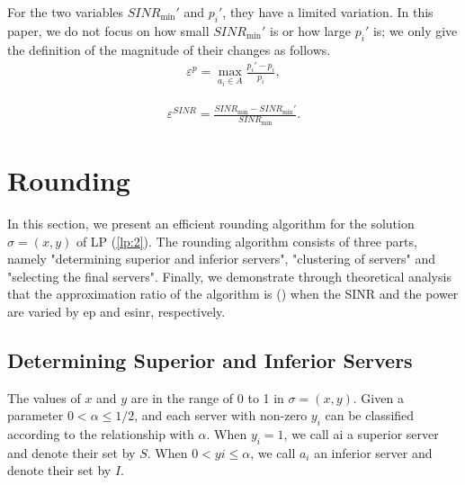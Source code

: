 \documentclass[11pt,a4paper]{article}
\begin{document}
For the two variables $SINR_{\min}'$ and $p_i'$, they have a limited variation. In this paper, we do not focus on how small $SINR_{\min}'$ is or how large $p_i'$ is; we only give the definition of the magnitude of their changes as follows.
\begin{eqnarray}
	{\varepsilon ^p} = \mathop {\max }\limits_{{a_i} \in A} \frac{{{p_i}' - {p_i}}}{{{p_i}}},
\end{eqnarray}


\begin{eqnarray}
	{\varepsilon ^{SINR}} = \frac{{SINR_{\min}} - SINR_{\min}'}{{SIN{R_{\min }}}}.
\end{eqnarray}



\section{Rounding}
In this section, we present an efficient rounding algorithm for the solution $\sigma=(x,y)$ of LP (\ref{lp:2}). The rounding algorithm consists of three parts, namely "determining superior and inferior servers", "clustering of servers" and "selecting the final servers". Finally, we demonstrate through theoretical analysis that the approximation ratio of the algorithm is () when the SINR and the power are varied by ep and esinr, respectively.



\subsection{Determining Superior and Inferior Servers}
The values of $x$ and $y$ are in the range of 0 to 1 in $\sigma=(x,y)$. Given a parameter $0<\alpha\le1/2$, and each server with non-zero $y_i$ can be classified according to the relationship with $\alpha$. When $y_i=1$, we call ai a superior server and denote their set by $S$. When $0< yi\le \alpha$, we call $a_i$ an inferior server and denote their set by $I$.
\end{document}
